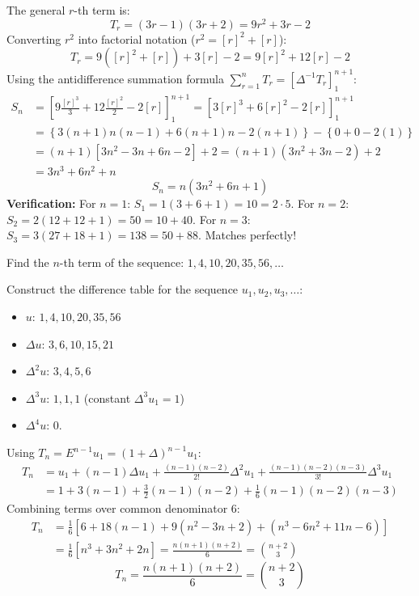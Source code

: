 \documentclass[11pt,a4paper]{article}
\begin{document}
\begin{solbox}
The general $r$-th term is:
$$T_r = (3r - 1)(3r + 2) = 9r^2 + 3r - 2$$
Converting $r^2$ into factorial notation ($r^2 = [r]^2 + [r]$):
$$T_r = 9([r]^2 + [r]) + 3[r] - 2 = 9[r]^2 + 12[r] - 2$$
Using the antidifference summation formula $\sum_{r=1}^n T_r = \left[ \Delta^{-1} T_r \right]_1^{n+1}$:
\begin{align*}
    S_n &= \left[ 9 \frac{[r]^3}{3} + 12 \frac{[r]^2}{2} - 2[r] \right]_1^{n+1} = \left[ 3[r]^3 + 6[r]^2 - 2[r] \right]_1^{n+1} \\
    &= \left\{ 3(n+1)n(n-1) + 6(n+1)n - 2(n+1) \right\} - \left\{ 0 + 0 - 2(1) \right\} \\
    &= (n+1)\left[ 3n^2 - 3n + 6n - 2 \right] + 2 = (n+1)(3n^2 + 3n - 2) + 2 \\
    &= 3n^3 + 6n^2 + n
\end{align*}
\begin{equation}
    \boxed{S_n = n(3n^2 + 6n + 1)}
\end{equation}
\textbf{Verification:}
For $n=1$: $S_1 = 1(3 + 6 + 1) = 10 = 2\cdot 5$.
For $n=2$: $S_2 = 2(12 + 12 + 1) = 50 = 10 + 40$.
For $n=3$: $S_3 = 3(27 + 18 + 1) = 138 = 50 + 88$. Matches perfectly!
\end{solbox}

\begin{exambox}
Find the $n$-th term of the sequence: $1, 4, 10, 20, 35, 56, \dots$
\end{exambox}

\begin{solbox}
Construct the difference table for the sequence $u_1, u_2, u_3, \dots$:
\begin{itemize}
    \item $u$: $1, 4, 10, 20, 35, 56$
    \item $\Delta u$: $3, 6, 10, 15, 21$
    \item $\Delta^2 u$: $3, 4, 5, 6$
    \item $\Delta^3 u$: $1, 1, 1$ (constant $\Delta^3 u_1 = 1$)
    \item $\Delta^4 u$: $0$.
\end{itemize}
Using $T_n = E^{n-1} u_1 = (1 + \Delta)^{n-1} u_1$:
\begin{align*}
    T_n &= u_1 + (n-1)\Delta u_1 + \frac{(n-1)(n-2)}{2!}\Delta^2 u_1 + \frac{(n-1)(n-2)(n-3)}{3!}\Delta^3 u_1 \\
    &= 1 + 3(n-1) + \frac{3}{2}(n-1)(n-2) + \frac{1}{6}(n-1)(n-2)(n-3)
\end{align*}
Combining terms over common denominator 6:
\begin{align*}
    T_n &= \frac{1}{6}\left[ 6 + 18(n-1) + 9(n^2 - 3n + 2) + (n^3 - 6n^2 + 11n - 6) \right] \\
    &= \frac{1}{6}\left[ n^3 + 3n^2 + 2n \right] = \frac{n(n+1)(n+2)}{6} = \binom{n+2}{3}
\end{align*}
\begin{equation}
    \boxed{T_n = \frac{n(n+1)(n+2)}{6} = \binom{n+2}{3}}
\end{equation}
\end{solbox}
\end{document}
